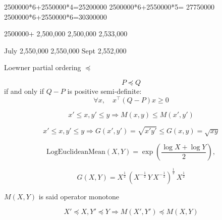 \documentclass{article}
\def\LEM{\mathrm{LogEuclideanMean}}
\begin{document}
2500000*6+2550000*4=25200000
2500000*6+2550000*5= 27750000
2500000*6+2550000*6=30300000


2500000+
2,500,000
2,500,000
2,533,000

July 2,550,000
2,550,000
Sept 2,552,000


Loewner partial ordering $\preceq$


$$
P\preceq Q
$$ if and only if $Q-P$ is positive semi-definite: 
$$
\forall x,\quad x^\top (Q-P)x \geq 0
$$

$$
x'\leq x, y'\leq y \Rightarrow M(x,y)\leq M(x',y')
$$

$$
x'\leq x, y'\leq y \Rightarrow G(x',y')=\sqrt{x'y'}\leq  G(x,y)=\sqrt{xy}
$$


$$
\LEM(X,Y)=\exp\left(\frac{\log X+\log Y}{2}\right),
$$

$$
G(X,Y)=X^{\frac{1}{2}}\, (X^{-\frac{1}{2}}\, Y\, X^{-\frac{1}{2}})^{\frac{1}{2}}\, X^{\frac{1}{2}} 
$$


$M(X,Y)$ is said operator monotone 

$$
X'\preceq X, Y'\preceq Y \Rightarrow M(X',Y')\preceq M(X,Y)
$$
\end{document}
